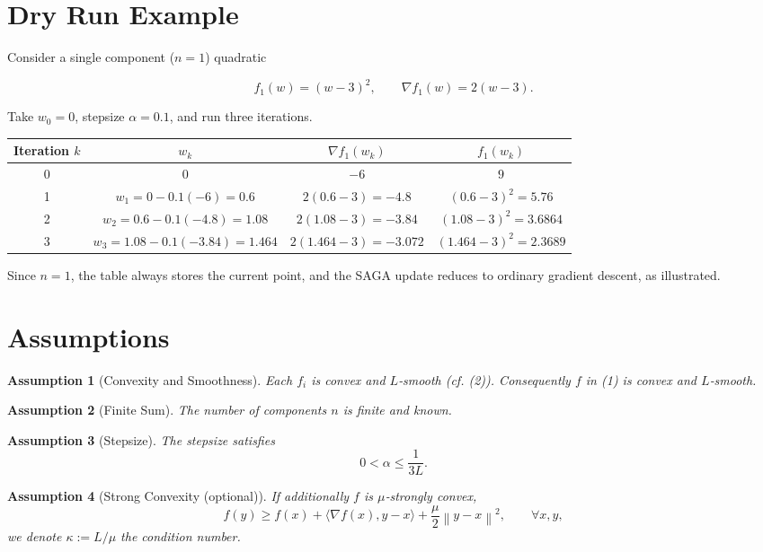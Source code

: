 \documentclass{article}
\newtheorem{assumption}{Assumption}
\newcommand{\norm}[1]{\left\lVert #1\right\rVert}
\begin{document}
\section*{Dry Run Example}
Consider a single component ($n=1$) quadratic  

\[
f_1(w)=(w-3)^2,
\qquad \nabla f_1(w)=2(w-3).
\]

Take $w_0=0$, stepsize $\alpha=0.1$, and run three iterations.

\begin{center}
\begin{tabular}{c|c|c|c}
Iteration $k$ & $w_k$ & $\nabla f_1(w_k)$ & $f_1(w_k)$\\ \hline
0 & $0$ & $-6$ & $9$\\
1 & $w_1=0-0.1(-6)=0.6$ & $2(0.6-3)=-4.8$ & $(0.6-3)^2=5.76$\\
2 & $w_2=0.6-0.1(-4.8)=1.08$ & $2(1.08-3)=-3.84$ & $(1.08-3)^2=3.6864$\\
3 & $w_3=1.08-0.1(-3.84)=1.464$ & $2(1.464-3)=-3.072$ & $(1.464-3)^2=2.3689$
\end{tabular}
\end{center}

Since $n=1$, the table always stores the current point, and the SAGA update reduces to ordinary gradient descent, as illustrated.

\newpage
\section*{Assumptions}
\begin{assumption}[Convexity and Smoothness]\label{ass:convex}
Each $f_i$ is convex and $L$‑smooth (cf. (2)). Consequently $f$ in (1) is convex and $L$‑smooth.
\end{assumption}
\begin{assumption}[Finite Sum]\label{ass:finite}
The number of components $n$ is finite and known.
\end{assumption}
\begin{assumption}[Stepsize]\label{ass:stepsize}
The stepsize satisfies 
\[
0<\alpha\le\frac{1}{3L}.
\tag{6}
\]
\end{assumption}
\begin{assumption}[Strong Convexity (optional)]\label{ass:strong}
If additionally $f$ is $\mu$‑strongly convex,
\[
f(y)\ge f(x)+\langle\nabla f(x),y-x\rangle+\frac{\mu}{2}\norm{y-x}^2,\qquad\forall x,y,
\tag{7}
\]
we denote $\kappa:=L/\mu$ the condition number.
\end{assumption}
\end{document}
